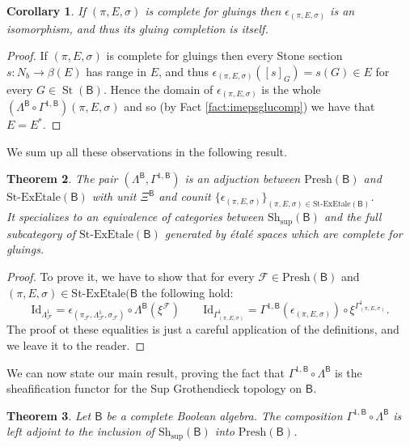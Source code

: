 \documentclass[11pt]{amsart}
\newcommand{\F}{\mathcal{F}}
\newcommand{\Id}{\textrm{Id}}
\newcommand{\Presh}{\textrm{Presh}}
\newcommand{\Sh}{\textrm{Sh}}
\newcommand{\stexetale}{\textrm{St-ExEtale}}
\theoremstyle{plain}
\newtheorem{theorem}{Theorem}[section]
\newtheorem{corollary}[theorem]{Corollary}
\theoremstyle{definition}
\theoremstyle{plain}
\theoremstyle{remark}
\DeclareMathOperator{\St}{St}
\newcommand{\bool}[1]{\mathsf{#1}}
\newcommand{\0}{\mathsf{0}}
\renewcommand{\1}{\mathsf{1}}
\renewcommand{\2}{\mathsf{2}}
\theoremstyle{definition}
\begin{document}
\begin{corollary}
If $(\pi, E, \sigma)$ is complete for gluings then $\epsilon_{(\pi, E, \sigma)}$ is an isomorphism, and thus its gluing completion is itself.
\end{corollary}
\begin{proof}
If $(\pi, E, \sigma)$ is complete for gluings then every Stone section $s:N_b\to\beta(E)$ has range in $E$, and thus $\epsilon_{(\pi, E, \sigma)}([s]_G)=s(G)\in E$ for every $G\in\St(\bool{B})$. Hence the domain of $\epsilon_{(\pi, E, \sigma)}$ is the whole $(\Lambda^{\bool{B}}\circ\Gamma^{1,\bool{B}})(\pi, E, \sigma)$ and so (by Fact \ref{fact:imepsglucomp}) we have that $E=E^*$.
\end{proof}
We sum up all these observations in the following result. 
\begin{theorem}
The pair $(\Lambda^{\bool{B}}, \Gamma^{1, \bool{B}})$ is an adjuction between $\Presh(\bool{B})$ and $\stexetale(\bool{B})$ with unit $\Xi^{\bool{B}}$ and counit $\{\epsilon_{(\pi, E, \sigma)}\}_{(\pi, E, \sigma)\in\stexetale(\bool{B})}$.\\
It specializes to an equivalence of categories between $\Sh_\mathrm{sup}(\bool{B})$ and the full subcategory of $\stexetale(\bool{B})$ generated by \'etal\'e spaces which are complete for gluings.
\end{theorem}
\begin{proof}
To prove it, we have to show that for every $\F\in\Presh(\bool{B})$ and $(\pi, E, \sigma)\in\stexetale(\bool{B}$ the following hold:
\[
\Id_{\Lambda^1_\F}=\epsilon_{(\pi_\F, \Lambda^1_\F, \sigma_\F)}\circ\Lambda^\bool{B}(\xi^\F)\quad\quad \Id_{\Gamma^1_{(\pi, E, \sigma)}}=\Gamma^{1, \bool{B}}(\epsilon_{(\pi, E, \sigma)})\circ\xi^{\Gamma^1_{(\pi, E, \sigma)}}.
\]
The proof ot these equalities is just a careful application of the definitions, and we leave it to the reader.
\end{proof}
We can now state our main result, proving the fact that $\Gamma^{1,\bool{B}}\circ\Lambda^{\bool{B}}$ is the sheafification functor for the Sup Grothendieck topology on $\bool{B}$.
\begin{theorem}\label{2mainthm:sheaf}
 Let $\bool{B}$ be a complete Boolean algebra. 
The composition $\Gamma^{1,\bool{B}}\circ\Lambda^{\bool{B}}$ is left adjoint to the inclusion of $\Sh_{\mathrm{sup}}(\bool{B})$ into $\Presh(\bool{B})$.
\end{theorem}
\end{document}
